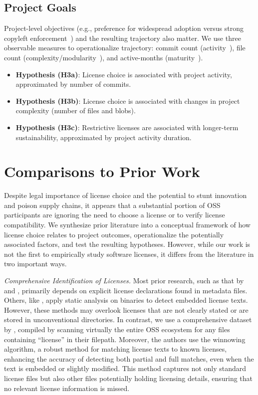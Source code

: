 \subsection{Project Goals}

Project-level objectives (e.g., preference for
widespread adoption versus strong copyleft
enforcement~\cite{sen2008determinants}) and the resulting trajectory
\cite{colazo2009impact} also matter.
We use three observable measures to operationalize trajectory:
commit count (activity~\cite{koch2002effort}),
file count (complexity/modularity~\cite{mockus2007large,bird2009putting}),
and active-months (maturity~\cite{capiluppi2003characteristics}).

\begin{itemize}
\item \textbf{Hypothesis (H3a)}: License choice is associated with project activity, approximated by number of commits.
\item \textbf{Hypothesis (H3b)}: License choice is associated with changes in project complexity (number of files and blobs).
\item \textbf{Hypothesis (H3c)}: Restrictive licenses are associated with longer-term sustainability, approximated by project activity duration.
\end{itemize}

\section{Comparisons to Prior Work}

Despite legal importance of license choice and the potential to stunt
innovation and poison supply chains, it appears that a substantial
portion of OSS participants are ignoring the need to choose a license
or to verify license compatibility. 
We synthesize prior literature into a conceptual framework of how
license choice relates to project outcomes, operationalize the
potentially associated factors, and test the resulting hypotheses.
However, while our work is not the first to empirically study software licenses,
it differs from the literature in two important ways.

\textit{Comprehensive Identification of Licenses.}
Most prior research, such as that by \citet{wu2024large} and \citet{xu2023lidetector}, primarily depends on explicit license declarations found in metadata files.
Others, like \citet{feng2019open}, apply static analysis on binaries to detect embedded license texts.
However, these methods may overlook licenses that are not clearly stated or are stored in unconventional directories.
In contrast, we use a comprehensive dataset by \citet{jahanshahi2024license}, 
compiled by scanning virtually the entire OSS ecosystem for any files containing ``license'' in their filepath.
Moreover, the authors use the winnowing algorithm, a robust method for matching license texts to known licenses, enhancing the accuracy of detecting both partial and full matches, even when the text is embedded or slightly modified.
This method captures not only standard license files but also other files potentially holding licensing details, ensuring that no relevant license information is missed.

